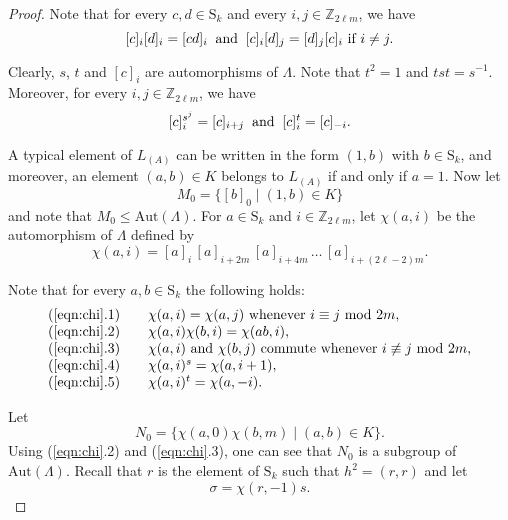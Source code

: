 \documentclass{amsart}
\theoremstyle{definition}
\begin{document}
\begin{proof}
Note that for every $c,d \in {\mathrm{S}}_k$ and every $i, j \in {\mathbb Z}_{2\ell m}$, we have
\begin{equation}
\label{eqn:new}
  [c]_i [d]_i = [cd]_i \> \hbox { and } \> [c]_i [d]_j = [d]_j [c]_i \hbox { if } i\not = j.
\end{equation}

Clearly, $s$, $t$ and $[c]_i$ are automorphisms of $\Lambda$. Note that $t^2=1$ and $tst=s^{-1}$. Moreover, for every $i,j \in {\mathbb Z}_{2\ell m}$,
we have  
\begin{equation}
\label{eqn:cisj}
[c]_i^{s^j}=[c]_{i+j} \> \hbox{ and } \> [c]_i^t=[c]_{-i}.
\end{equation}

A typical element of $L_{(A)}$ can be written in the form $(1,b)$ with $b\in {\mathrm{S}}_k$, and moreover, an element $(a,b) \in K$ belongs to $L_{(A)}$ if and only if $a=1$. Now let
\begin{equation}
\label{eqn:M0}
M_0 = \{ [b]_0 \mid (1,b) \in K\}
\end{equation}
and note that $M_0 \le {\mathrm{Aut}}(\Lambda)$. For $a\in {\mathrm{S}}_k$ and $i\in {\mathbb Z}_{2\ell m}$, let $\chi(a,i)$ be the automorphism of $\Lambda$ defined by
 \begin{equation}
 \label{chidef}
 \chi(a,i) = [a]_i \, [a]_{i+2m} \, [a]_{i+4m}\, \ldots\, [a]_{i+(2\ell-2)m}.
 \end{equation}
 
Note that for every $a,b\in {\mathrm{S}}_k$ the following holds:
\begin{equation}
\label{eqn:chi}
\begin{array}{l}
(\ref{eqn:chi}.1)\qquad \chi(a,i) = \chi(a,j) \hbox{ whenever } i \equiv j \hbox{ mod } 2m, \\
(\ref{eqn:chi}.2)\qquad\chi(a,i)\chi(b,i) = \chi(ab,i), \\
(\ref{eqn:chi}.3)\qquad\chi(a,i) \hbox{ and } \chi(b,j) \hbox{ commute whenever } i \not \equiv j \hbox{ mod } 2m, \\
(\ref{eqn:chi}.4)\qquad\chi(a,i)^s = \chi(a,i+1), \\
(\ref{eqn:chi}.5)\qquad\chi(a,i)^t = \chi(a,-i).
\end{array}
\end{equation}

Let 
$$N_0=\{\chi(a,0)\chi(b,m) \mid (a,b)\in K\}.$$
Using (\ref{eqn:chi}.2) and (\ref{eqn:chi}.3), one can see that $N_0$ is a subgroup of ${\mathrm{Aut}}(\Lambda)$. Recall that $r$ is the element of ${\mathrm{S}}_k$ such that $h^2 = (r,r)$ and let 
$$\sigma=\chi(r,-1)s.$$


\end{proof}
\end{document}

